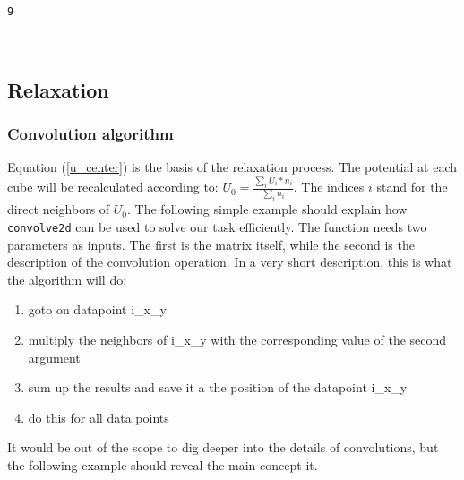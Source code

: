 \documentclass[11pt]{article}
\providecommand{\tightlist}{%
      \setlength{\itemsep}{0pt}\setlength{\parskip}{0pt}}
\begin{document}
\begin{tcolorbox}[breakable, size=fbox, boxrule=1pt, pad at break*=1mm,colback=cellbackground, colframe=cellborder]
\begin{Verbatim}[commandchars=\\\{\}]
\end{Verbatim}
\end{tcolorbox}

    \begin{Verbatim}[commandchars=\\\{\}]
9
    \end{Verbatim}

    \begin{center}
    \end{center}
    { \hspace*{\fill} \\}
    
    \hypertarget{relaxation}{%
\subsection{Relaxation}\label{relaxation}}

\hypertarget{convolution-algorithm}{%
\subsubsection{Convolution algorithm}\label{convolution-algorithm}}

Equation (\ref{u_center}) is the basis of the relaxation process. The
potential at each cube will be recalculated according to:
\(U_0 = \frac{\sum_{i}{U_i*n_i}}{\sum_{i}{n_i}}\). The indices \(i\)
stand for the direct neighbors of \(U_0\). The following simple example
should explain how \texttt{convolve2d} can be used to solve our task
efficiently. The function needs two parameters as inputs. The first is
the matrix itself, while the second is the description of the
convolution operation. In a very short description, this is what the
algorithm will do:

\begin{enumerate}
\def\labelenumi{\arabic{enumi}.}
\tightlist
\item
  goto on datapoint i\_x\_y
\item
  multiply the neighbors of i\_x\_y with the corresponding value of the
  second argument
\item
  sum up the results and save it a the position of the datapoint i\_x\_y
\item
  do this for all data points
\end{enumerate}

It would be out of the scope to dig deeper into the details of
convolutions, but the following example should reveal the main concept
it.
\end{document}
